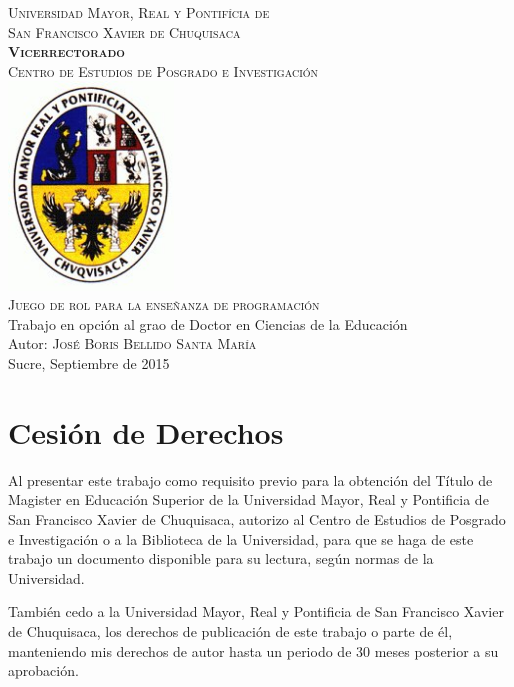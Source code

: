 \documentclass[12pt,letterpaper,titlepage,oneside]{book}
\begin{document}
\begin{titlepage}
\begin{center}
{\LARGE {\textsc{Universidad Mayor, Real y Pontifícia de \\ San Francisco Xavier de Chuquisaca}}} \\ [1.3cm]
{\Large \textsc \textbf{\textsc{Vicerrectorado}}} \\ [1.3cm]
{\Large \textsc{Centro de Estudios de Posgrado e Investigación}} \\ [1.3cm]
\includegraphics[width=4.4cm]{escudo.jpg} \\ [1.3cm]
{\Large {\textsc{Juego de rol para la enseñanza de programación}}} \\[1.3cm]
 {Trabajo en opción al grao de Doctor en Ciencias de la Educación} \\[1.3cm]
{Autor: \textsc{José Boris Bellido Santa María}}\\[1.3cm]
Sucre, Septiembre de 2015
\end{center}
\end{titlepage}

\chapter*{Cesión de Derechos}
Al presentar este trabajo como requisito previo para la obtención del Título de Magister en
Educación Superior de la Universidad Mayor, Real y Pontificia de San Francisco Xavier de Chuquisaca, autorizo al Centro de Estudios de Posgrado e Investigación o a la Biblioteca de la Universidad, para que se haga de este trabajo un documento disponible para su lectura, según normas de la Universidad.

También cedo a la Universidad Mayor, Real y Pontificia de San Francisco Xavier de Chuquisaca, los derechos de publicación de este trabajo o parte de él, manteniendo mis derechos de autor hasta un periodo de 30 meses posterior a su aprobación.
\\[3cm]
\end{document}

